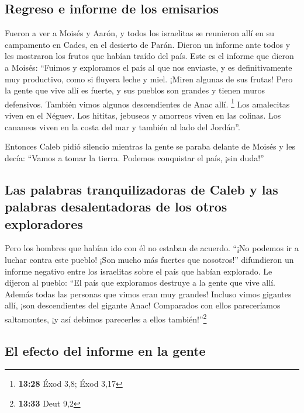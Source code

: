 \hypertarget{regreso-e-informe-de-los-emisarios}{%
\subsection{Regreso e informe de los
emisarios}\label{regreso-e-informe-de-los-emisarios}}

 Fueron a ver a Moisés y Aarón, y todos los israelitas se
reunieron allí en su campamento en Cades, en el desierto de Parán.
Dieron un informe ante todos y les mostraron los frutos que habían
traído del país.  Este es el informe que dieron a Moisés:
``Fuimos y exploramos el país al que nos enviaste, y es definitivamente
muy productivo, como si fluyera leche y miel. ¡Miren algunas de sus
frutas!  Pero la gente que vive allí es fuerte, y sus
pueblos son grandes y tienen muros defensivos. También vimos algunos
descendientes de Anac allí. \footnote{\textbf{13:28} Éxod 3,8; Éxod 3,17}
 Los amalecitas viven en el Néguev. Los hititas, jebuseos
y amorreos viven en las colinas. Los cananeos viven en la costa del mar
y también al lado del Jordán''.

 Entonces Caleb pidió silencio mientras la gente se
paraba delante de Moisés y les decía: ``Vamos a tomar la tierra. Podemos
conquistar el país, ¡sin duda!''

\hypertarget{las-palabras-tranquilizadoras-de-caleb-y-las-palabras-desalentadoras-de-los-otros-exploradores}{%
\subsection{Las palabras tranquilizadoras de Caleb y las palabras
desalentadoras de los otros
exploradores}\label{las-palabras-tranquilizadoras-de-caleb-y-las-palabras-desalentadoras-de-los-otros-exploradores}}

 Pero los hombres que habían ido con él no estaban de
acuerdo. ``¡No podemos ir a luchar contra este pueblo! ¡Son mucho más
fuertes que nosotros!''  difundieron un informe negativo
entre los israelitas sobre el país que habían explorado. Le dijeron al
pueblo: ``El país que exploramos destruye a la gente que vive allí.
Además todas las personas que vimos eran muy grandes! 
Incluso vimos gigantes allí, ¡son descendientes del gigante Anac!
Comparados con ellos pareceríamos saltamontes, ¡y así debimos parecerles
a ellos también!''\footnote{\textbf{13:33} Deut 9,2}

\hypertarget{el-efecto-del-informe-en-la-gente}{%
\subsection{El efecto del informe en la
gente}\label{el-efecto-del-informe-en-la-gente}}

